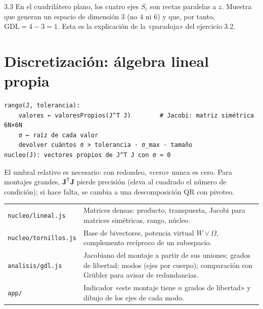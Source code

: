 \documentclass[11pt,a4paper]{article}
\begin{document}
\begin{ejercicio}{3.3}
En el cuadrilátero plano, los cuatro ejes $S_i$ son rectas paralelas a $z$. Muestra que generan un espacio de dimensión
3 (no 4 ni 6) y que, por tanto, $\text{GDL} = 4 - 3 = 1$. Esta es la explicación de la «paradoja» del ejercicio 3.2.
\end{ejercicio}

\section{Discretización: álgebra lineal propia}

\begin{codigo}
\begin{lstlisting}
rango(J, tolerancia):
    valores ← valoresPropios(J^T J)        # Jacobi: matriz simétrica 6N×6N
    σ ← raíz de cada valor
    devolver cuántos σ > tolerancia · σ_max · tamaño
nucleo(J): vectores propios de J^T J con σ ≈ 0
\end{lstlisting}
El umbral relativo es necesario: con redondeo, «cero» nunca es cero. Para montajes grandes, $\mathbf J^{\mathsf T}\mathbf J$
pierde precisión (eleva al cuadrado el número de condición); si hace falta, se cambia a una descomposición QR con
pivoteo.
\end{codigo}

\begin{codigo}
\begin{tabularx}{\linewidth}{@{}l Y@{}}
\texttt{nucleo/lineal.js} & Matrices densas: producto, transpuesta, Jacobi para matrices simétricas, rango, núcleo.\\
\texttt{nucleo/tornillos.js} & Base de bivectores, potencia virtual $W\vee\Omega$, complemento recíproco de un
  subespacio.\\
\texttt{analisis/gdl.js} & Jacobiano del montaje a partir de sus uniones; grados de libertad; modos (ejes por
  cuerpo); comparación con Grübler para avisar de redundancias.\\
\texttt{app/} & Indicador «este montaje tiene $n$ grados de libertad» y dibujo de los ejes de cada modo.\\
\end{tabularx}
\end{codigo}
\end{document}

